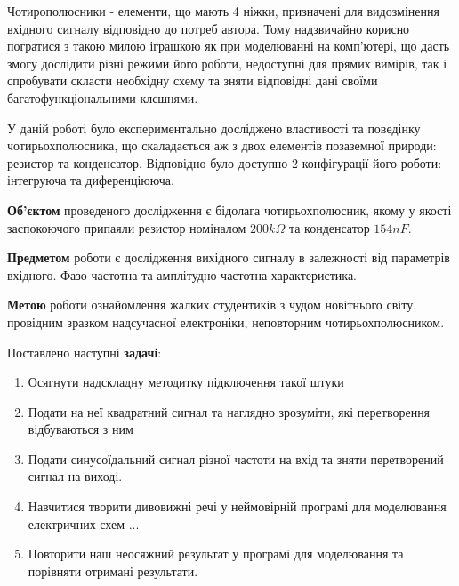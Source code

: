 
Чотирополюсники - елементи, що мають 4 ніжки, призначені для видозмінення вхідного сигналу відповідно до потреб автора. Тому надзвичайно корисно погратися з такою милою іграшкою як при моделюванні на комп'ютері, що дасть змогу дослідити різні режими його роботи, недоступні для прямих вимірів, так і спробувати скласти необхідну схему та зняти відповідні дані своїми багатофункціональними клєшнями.

У даній роботі було експериментально досліджено властивості та поведінку чотирьохполюсника, що скаладається аж з двох елементів позаземної природи: резистор та конденсатор. Відповідно було доступно 2 конфігурації його роботи: інтегруюча та диференціююча.

\textbf{Об'єктом} проведеного дослідження є бідолага чотирьохполюсник, якому у якості заспокоючого припаяли резистор номіналом $200 k\Omega$ та конденсатор $154 nF$. 

\textbf{Предметом} роботи є дослідження вихідного сигналу в залежності від параметрів вхідного. Фазо-частотна та амплітудно частотна характеристика.

\textbf{Метою} роботи ознайомлення жалких студентиків з чудом новітнього світу, провідним зразком надсучасної електроніки, неповторним чотирьохполюсником.

Поставлено наступні \textbf{задачі}: 
\begin{enumerate}
\item Осягнути надскладну методитку підключення такої штуки
\item Подати на неї квадратний сигнал та наглядно зрозуміти, які перетворення відбуваються з ним
\item Подати синусоїдальний сигнал різної частоти на вхід та зняти перетворений сигнал на виході.
\item Навчитися творити дивовижні речі у неймовірній програмі для моделювання електричних схем ...
\item Повторити наш неосяжний результат у програмі для моделювання та порівняти отримані результати.
\end{enumerate}
